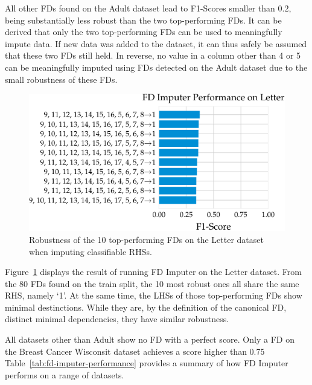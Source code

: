 All other FDs found on the Adult dataset lead to F1-Scores smaller than \( 0.2\), being substantially less robust than the two top-performing FDs.
It can be derived that only the two top-performing FDs can be used to meaningfully impute data.
If new data was added to the dataset, it can thus safely be assumed that these two FDs still held.
In reverse, no value in a column other than 4 or 5 can be meaningfully imputed using FDs detected on the Adult dataset due to the small robustness of these FDs.

\begin{figure}[ht]
     \centering
     \includegraphics[width=.8\textwidth]{../figures/letter/f1_fd_imputer_letter.pdf}
     \caption{Robustness of the 10 top-performing FDs on the Letter dataset when imputing classifiable RHSs.}
     \label{fig:f1_fd_letter}
\end{figure}
Figure~\ref{fig:f1_fd_letter} displays the result of running FD Imputer on the Letter dataset.
From the 80 FDs found on the train split, the 10 most robust ones all share the same RHS, namely `1'.
At the same time, the LHSs of those top-performing FDs show minimal destinctions.
While they are, by the definition of the canonical FD, distinct minimal dependencies, they have similar robustness.


All datasets other than Adult show no FD with a perfect score.
Only a FD on the Breast Cancer Wisconsit dataset achieves a score higher than 0.75
Table~\ref{tab:fd-imputer-performance} provides a summary of how FD Imputer performs on a range of datasets.

